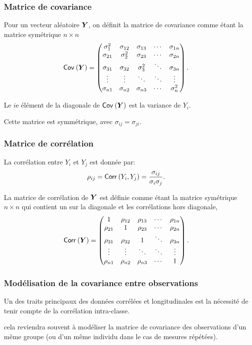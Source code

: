 \documentclass{beamer}
\begin{document}
\begin{frame}
\frametitle{Matrice de covariance}
 Pour un vecteur aléatoire $\boldsymbol {Y}$, 
on définit la \alert{matrice de covariance} comme étant la matrice symétrique $n\times n$
\[
{\mathsf{Cov}_{}}\left(\boldsymbol {Y}\right)=
  \begin{pmatrix}
    \sigma_{1}^2 & \sigma_{12} & \sigma_{13} & \cdots & \sigma_{1n} \\
     \sigma_{21} & \sigma_{2}^2 & \sigma_{23} & \cdots & \sigma_{2n} \\
      \sigma_{31} & \sigma_{32} & \sigma_{3}^2 & \ddots & \sigma_{3n} \\
    \vdots &  \vdots &  \ddots & \ddots &  \vdots \\
        \sigma_{n1} & \sigma_{n2} & \sigma_{n3} & \cdots & \sigma_{n}^2 \\
  \end{pmatrix}.
\]
\bi
\item Le $i$e élément de la diagonale de  ${\mathsf{Cov}_{}}\left(\boldsymbol {Y}\right)$ est la variance de $Y_i$.
\item Cette matrice est symmétrique, avec  $\sigma_{ij}=\sigma_{ji}$.
\ei
\end{frame}

\begin{frame}
\frametitle{Matrice de corrélation}
\bi
\item La corrélation entre $Y_i$ et $Y_j$ est donnée par:
\begin{align*}
\rho_{ij}={\mathsf{Corr}_{}}\left(Y_i, Y_j\right)=\frac{\sigma_{ij}}{\sigma_i\sigma_j}.
\end{align*}
\item La \alert{matrice de corrélation} de $\boldsymbol {Y}$ est définie comme étant la matrice symétrique
$n\times n$ qui contient un sur la diagonale et les corrélations hors diagonale, 
\[
{\mathsf{Corr}_{}}\left(\boldsymbol {Y}\right)=
  \begin{pmatrix}
    1 & \rho_{12} & \rho_{13} & \cdots & \rho_{1n} \\
     \rho_{21} & 1 & \rho_{23}& \cdots & \rho_{2n} \\
     \rho_{31} & \rho_{32} & 1& \ddots & \rho_{3n} \\
    \vdots &  \vdots &  \ddots & \ddots &  \vdots \\
        \rho_{n1} & \rho_{n2} & \rho_{n3} & \cdots & 1 \\
  \end{pmatrix}.
\]
\ei
\end{frame}
\begin{frame}
 \frametitle{Modélisation de la covariance entre observations}
 Un des traits principaux des données
corrélées et longitudinales est la nécessité de tenir compte de la corrélation
intra-classe.
\bi \item cela reviendra souvent à modéliser la matrice de covariance
des observations d'un même groupe (ou d'un même individu dans le cas de
mesures répétées).
\ei
\end{frame}
\end{document}
